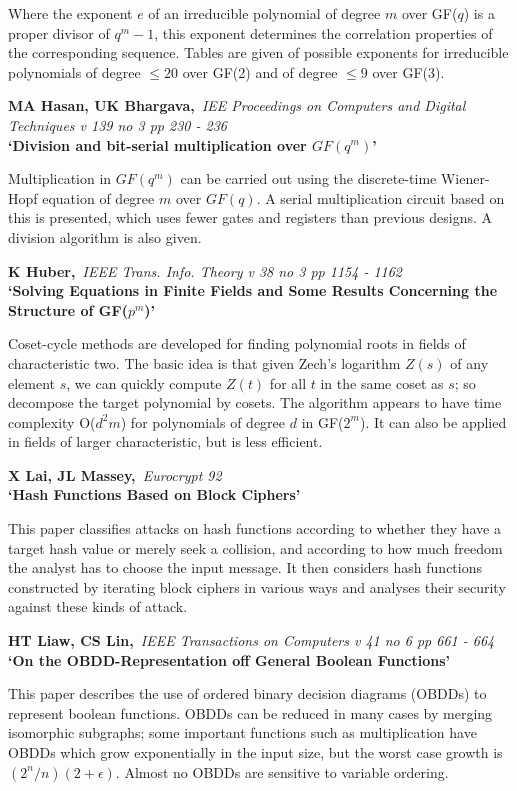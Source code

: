 Where the exponent $e$ of an irreducible polynomial of degree $m$ over GF($q$) 
is a proper divisor of $q^m-1$, this exponent determines the correlation
properties of the corresponding sequence. Tables are given of possible
exponents for irreducible polynomials of degree $\leq 20$ over GF(2) and of
degree $\leq 9$ over GF(3).

{\bf \noindent MA Hasan, UK Bhargava,}{\em ~IEE Proceedings on Computers and 
Digital Techniques v 139 no 3 pp 230 - 236\\}
{\bf `Division and bit-serial multiplication over $GF(q^m)$'}

Multiplication in $GF(q^m)$ can be carried out using the discrete-time
Wiener-Hopf equation of degree $m$ over $GF(q)$. A serial multiplication
circuit based on this is presented, which uses fewer gates and registers than
previous designs. A division algorithm is also given.

{\bf \noindent K Huber,}{\em ~IEEE Trans. Info. Theory v 38 no 3 pp 1154 -
1162\\}
{\bf `Solving Equations in Finite Fields and Some Results Concerning the
Structure of GF($p^m$)'}

Coset-cycle methods are developed for finding polynomial roots in fields
of characteristic two. The basic idea is that given Zech's logarithm $Z(s)$ 
of any element $s$, we can quickly compute $Z(t)$ for all $t$ in the same 
coset as $s$; so decompose the target polynomial by cosets. The algorithm 
appears to have time complexity O($d^2m$) for polynomials of degree $d$ in 
GF($2^m$). It can also be applied in fields of larger characteristic, but is
less efficient.

{\bf \noindent X Lai, JL Massey,}{\em ~Eurocrypt 92\\}
{\bf `Hash Functions Based on Block Ciphers'}

This paper classifies attacks on hash functions according to whether they
have a target hash value or merely seek a collision, and according to how 
much freedom the analyst has to choose the input message. It then considers 
hash functions constructed by iterating block ciphers in various ways and 
analyses their security against these kinds of attack.

{\bf \noindent HT Liaw, CS Lin,}{\em ~IEEE Transactions on Computers v 41 no
6 pp 661 - 664\\}
{\bf `On the OBDD-Representation off General Boolean Functions'}

This paper describes the use of ordered binary decision diagrams (OBDDs) to
represent boolean functions. OBDDs can be reduced in many cases by merging 
isomorphic subgraphs; some important functions such as multiplication have
OBDDs which grow exponentially in the input size, but the worst case growth
is $(2^n/n)(2+\epsilon)$. Almost no OBDDs are sensitive to variable ordering.

